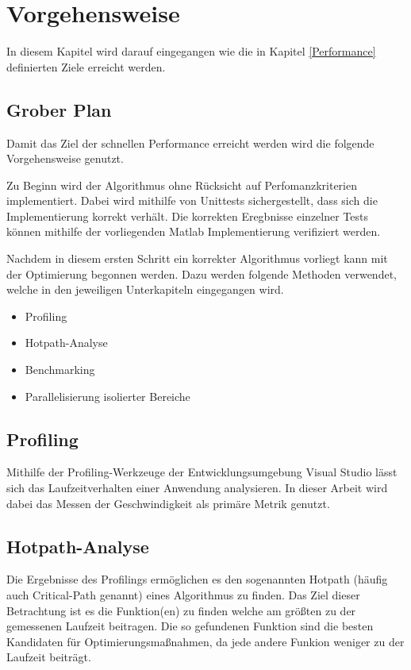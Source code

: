 \chapter{Vorgehensweise}\label{plan}

In diesem Kapitel wird darauf eingegangen wie die in Kapitel \ref{Performance} definierten Ziele erreicht werden.


\section{Grober Plan}

Damit das Ziel der schnellen Performance erreicht werden wird die folgende Vorgehensweise genutzt.

Zu Beginn wird der Algorithmus ohne Rücksicht auf Perfomanzkriterien implementiert.
Dabei wird mithilfe von Unittests sichergestellt, dass sich die Implementierung korrekt verhält. 
Die korrekten Eregbnisse einzelner Tests können mithilfe der vorliegenden Matlab Implementierung verifiziert werden.

Nachdem in diesem ersten Schritt ein korrekter Algorithmus vorliegt kann mit der Optimierung begonnen werden.
Dazu werden folgende Methoden verwendet, welche in den jeweiligen Unterkapiteln eingegangen wird.

\begin{itemize}
    \item Profiling
    \item Hotpath-Analyse
    \item Benchmarking
    \item Parallelisierung isolierter Bereiche
\end{itemize}

\section{Profiling}

Mithilfe der Profiling-Werkzeuge der Entwicklungsumgebung Visual Studio lässt sich das Laufzeitverhalten einer Anwendung analysieren.
In dieser Arbeit wird dabei das Messen der Geschwindigkeit als primäre Metrik genutzt. 


\section{Hotpath-Analyse}

Die Ergebnisse des Profilings ermöglichen es den sogenannten Hotpath (häufig auch Critical-Path genannt) eines Algorithmus zu finden.
Das Ziel dieser Betrachtung ist es die Funktion(en) zu finden welche am größten zu der gemessenen Laufzeit beitragen. 
Die so gefundenen Funktion sind die besten Kandidaten für Optimierungsmaßnahmen, da jede andere Funkion weniger zu der Laufzeit beiträgt.


